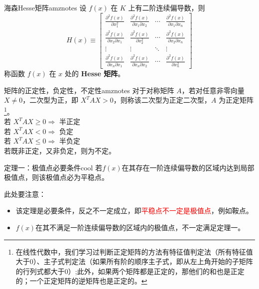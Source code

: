 \begin{dfnbox}{海森Hesse矩阵}{amznotes}
    设 $f(x)$ 在 $K$ 上有二阶连续偏导数，则
    \[
    H(x) \equiv \begin{bmatrix}
        \frac{\partial^2 f(x)}{\partial x_1^2} & \frac{\partial^2 f(x)}{\partial x_1 \partial x_2} & \cdots & \frac{\partial^2 f(x)}{\partial x_1 \partial x_n} \\
        \frac{\partial^2 f(x)}{\partial x_2 \partial x_1} & \frac{\partial^2 f(x)}{\partial x_2^2} & \cdots & \frac{\partial^2 f(x)}{\partial x_2 \partial x_n} \\
        \vdots & \vdots & \ddots & \vdots \\
        \frac{\partial^2 f(x)}{\partial x_n \partial x_1} & \frac{\partial^2 f(x)}{\partial x_n \partial x_2} & \cdots & \frac{\partial^2 f(x)}{\partial x_n^2}
    \end{bmatrix}
    \]
    称函数 $f(x)$ 在 $x$ 处的 \textbf{Hesse 矩阵}。
\end{dfnbox}
\begin{dfnbox}{矩阵的正定性，负定性，不定性}{amznotes}
    对于对称矩阵 $A$，若对任意非零向量 $X \neq 0$，二次型为正，即 $X^T A X > 0$，则称该二次型为正定二次型，$A$ 为正定矩阵\footnote{在线性代数中，我们学习过判断正定矩阵的方法有特征值判定法（所有特征值大于0）、主子式判定法（如果所有阶的顺序主子式，即从左上角开始的子矩阵的行列式都大于0）;此外，如果两个矩阵都是正定的，那他们的和也是正定的；一个正定矩阵的逆矩阵也是正定的。}。\\
    若 $X^T A X \geq 0 \Rightarrow$ 半正定\\
    若 $X^T A X < 0 \Rightarrow$ 负定\\
    若 $X^T A X \leq 0 \Rightarrow$ 半负定\\
    若既非正定，又非负定，则为不定。
\end{dfnbox}
\begin{thmbox}{定理一：极值点必要条件}{cool}
    若$f(x)$在其存在一阶连续偏导数的区域内达到局部极值点，则该极值点必为平稳点。
\end{thmbox}
此处要注意：
\begin{itemize}
    \item 该定理是必要条件，反之不一定成立，即\textcolor{red}{平稳点不一定是极值点}，例如鞍点。
    \item $f(x)$在其不满足一阶连续偏导数的区域内的极值点，不一定满足定理一。
\end{itemize}
